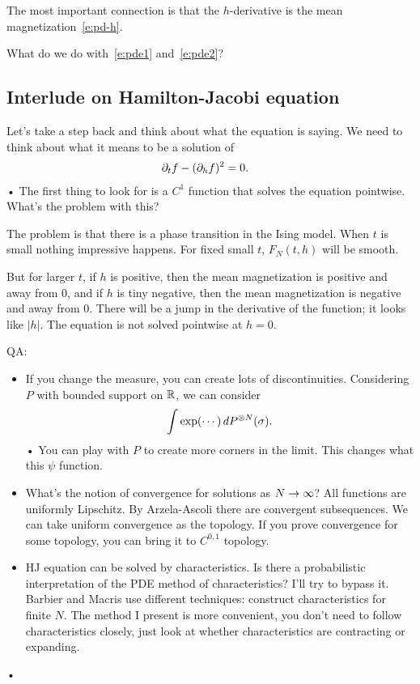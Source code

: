The most important connection %
is that the $h$-derivative is the mean magnetization~\eqref{e:pd-h}.

What do we do with~\eqref{e:pde1} and~\eqref{e:pde2}?  

\subsection{Interlude on Hamilton-Jacobi equation}

Let's take a step back and think about what the equation is saying. We need to think about what it means to be a solution of 
\begin{align}
\label{e:hj}
\partial_t f - (\partial_h f)^2&=0.
\end{align}•
The first thing to look for is a $C^1$ function that solves the equation pointwise. What's the problem with this?

The problem is that there is a phase transition in the Ising model. When $t$ is small nothing impressive happens. For fixed small $t$, $F_N(t,h)$ will be smooth. 

But for larger $t$, if $h$ is positive, then the mean magnetization is positive and away from 0, and if $h$ is tiny negative, then the mean magnetization is negative and away from 0. There will be a jump in the derivative of the function; it looks like $|h|$. The equation is not solved pointwise at $h=0$.

QA:
\begin{itemize}
\item
If you change the measure, you can create lots of discontinuities.
Considering $P$ with bounded support on $\mathbb{R}$, we can consider
\begin{align*}
\int \exp(\cdots) \,dP^{\otimes N}(\sigma). 
\end{align*}•
You can play with $P$ to create more corners in the limit.
This changes what this $\psi$ function.
\item 
What's the notion of convergence for solutions as $N\to \infty$? All functions are uniformly Lipschitz. By Arzela-Ascoli there are convergent subsequences. We can take uniform convergence as the topology. If you prove convergence for some topology, you can bring it to $C^{0,1}$ topology.
\item 
HJ equation can be solved by characteristics. Is there a probabilistic interpretation of the PDE method of characteristics?
I'll try to bypass it. 
Barbier and Macris \cite{barbier2019adaptive} 
use different techniques: construct characteristics for finite $N$.
The method I present is more convenient, you don't need to follow characteristics closely, just look at whether characteristics are contracting or expanding. %
\end{itemize}•

